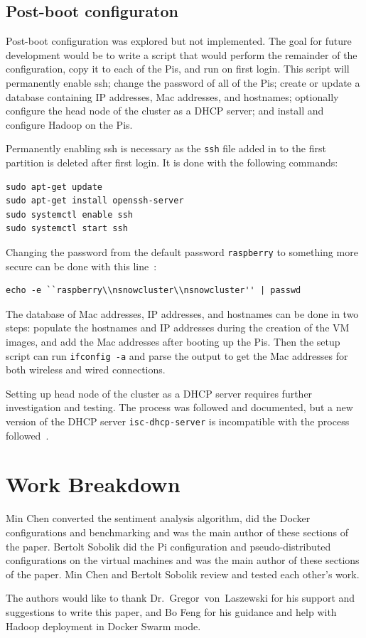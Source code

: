 \subsection{Post-boot configuraton}
Post-boot configuration was explored but not implemented. The goal for
future development would be to write a script that would perform the
remainder of the configuration, copy it to each of the Pis, and run on
first login. This script will permanently enable ssh; change the
password of all of the Pis; create or update a database containing IP
addresses, Mac addresses, and hostnames; optionally configure the head
node of the cluster as a DHCP server; and install and configure Hadoop
on the Pis.

Permanently enabling ssh is necessary as the \verb|ssh| file added in
to the first partition is deleted after first login. It is done with
the following commands:
\begin{verbatim} 
sudo apt-get update
sudo apt-get install openssh-server
sudo systemctl enable ssh
sudo systemctl start ssh
\end{verbatim}

Changing the password from the default password \verb|raspberry| to
something more secure can be done with this
line~\cite{hid-sp18-419-so-password}:
\begin{verbatim} 
echo -e ``raspberry\\nsnowcluster\\nsnowcluster'' | passwd
\end{verbatim}

The database of Mac addresses, IP addresses, and hostnames can be done
in two steps: populate the hostnames and IP addresses during the
creation of the VM images, and add the Mac addresses after booting up
the Pis. Then the setup script can run \verb|ifconfig -a| and parse
the output to get the Mac addresses for both wireless and wired
connections. 

Setting up head node of the cluster as a DHCP server requires further
investigation and testing. The process was followed and documented,
but a new version of the DHCP server \verb|isc-dhcp-server| is
incompatible with the process followed~\cite{hid-sp18-419-pi-DHCP}.

\section{Work Breakdown}
Min Chen converted the sentiment analysis algorithm, did the Docker
configurations and benchmarking and was the main author of these
sections of the paper. Bertolt Sobolik did the Pi configuration and
pseudo-distributed configurations on the virtual machines and was the
main author of these sections of the paper. Min Chen and Bertolt
Sobolik review and tested each other's work.

\begin{acks}

  The authors would like to thank Dr.~Gregor~von~Laszewski for his
  support and suggestions to write this paper, and Bo Feng for his guidance 
  and help with Hadoop deployment in Docker Swarm mode.

\end{acks}



